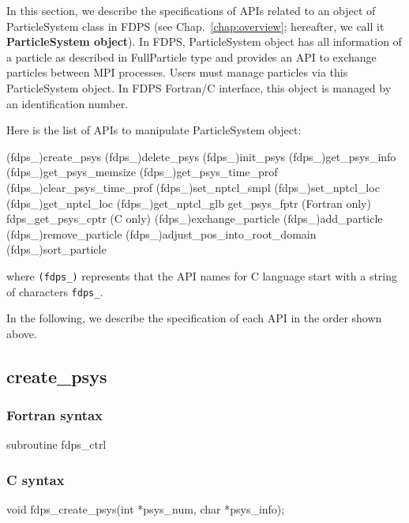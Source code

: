 In this section, we describe the specifications of APIs related to an object of ParticleSystem class in FDPS (see Chap.~\ref{chap:overview}; hereafter, we call it \textbf{ParticleSystem object}). In FDPS, ParticleSystem object has all information of a particle as described in FullParticle type and provides an API to exchange particles between MPI processes. Users must manage particles via this ParticleSystem object. In FDPS Fortran/C interface, this object is managed by an identification number.

Here is the list of APIs to manipulate ParticleSystem object:
\begin{screen}
\begin{spverbatim}
(fdps_)create_psys
(fdps_)delete_psys
(fdps_)init_psys
(fdps_)get_psys_info
(fdps_)get_psys_memsize
(fdps_)get_psys_time_prof
(fdps_)clear_psys_time_prof
(fdps_)set_nptcl_smpl
(fdps_)set_nptcl_loc
(fdps_)get_nptcl_loc
(fdps_)get_nptcl_glb
get_psys_fptr (Fortran only)
fdps_get_psys_cptr (C only)
(fdps_)exchange_particle
(fdps_)add_particle 
(fdps_)remove_particle
(fdps_)adjust_pos_into_root_domain
(fdps_)sort_particle
\end{spverbatim}
\end{screen}
where \texttt{(fdps\_)} represents that the API names for C language start with a string of characters \texttt{fdps\_}.

In the following, we describe the specification of each API in the order shown above.
\clearpage


\subsection{create\_psys}
\subsubsection*{Fortran syntax}
\begin{screen}
\begin{spverbatim}
subroutine fdps_ctrl%
\end{spverbatim}
\end{screen}

\subsubsection*{C syntax}
\begin{screen}
\begin{spverbatim}
void fdps_create_psys(int *psys_num,
                      char *psys_info);
\end{spverbatim}
\end{screen}

